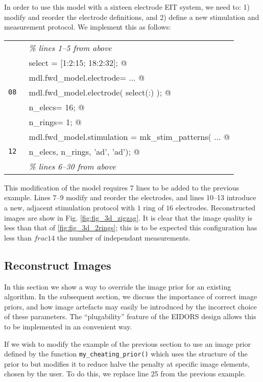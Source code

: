 \documentclass[12pt]{iopart}
\makeatletter
\newcommand{\CN}{\tt\small} %
\newcommand{\CC}{&\verb@}   % start code
\newcommand{\CI}{&\it}   % start code
\makeatother
\begin{document}
In order to use this model with a sixteen electrode EIT
system, we need to: 1) modify and reorder the electrode
definitions, and 2) define a new stimulation and measurement
protocol. We implement this as follows:

\begin{tabular}{ll}
\CN    \CI \% lines 1--5 from above \\
\CN    \CC select = [1:2:15; 18:2:32]; @\\
\CN    \CC mdl.fwd_model.electrode=  ... @\\
\CN 08 \CC     mdl.fwd_model.electrode( select(:) ); @\\
\CN    \CC n_elecs= 16; @\\
\CN    \CC n_rings= 1; @\\
\CN    \CC mdl.fwd_model.stimulation = mk_stim_patterns( ... @\\
\CN 12 \CC              n_elecs, n_rings, '{ad}', '{ad}'); @\\
\CN    \CI \% lines 6--30 from above \\
\end{tabular}

This modification of the model requires 7 lines to be added
to the previous example. Lines 7--9 modify and reorder the
electrodes, and lines 10--13 introduce a new, adjacent
stimulation protocol with $1$ ring of $16$ electrodes. Reconstructed
images are show in Fig. \ref{fig:fig_3d_zigzag}.
It is clear that the image quality is less than that of
\ref{fig:fig_3d_2rings}; this is to be expected this configuration
has less than $frac{1}{4}$ the number of independant measurements.
 

\subsection{  Reconstruct Images }

In this section we show a way to override the image prior
for an existing algorithm. In the subsequent section,
we discuss the importance of correct image priors,
and how image artefacts may easily be introduced by the incorrect
choice of these parameters. The ``plugability'' feature of the
EIDORS design allows this to be implemented in an convenient way.

If we wish to modify the example of the previous section
to use an image prior defined by the function
{\tt my\_cheating\_prior()} which uses the structure of the
prior to \cite{Polydorides_2002} but modifies it to reduce
halve the penalty at specific image elements, chosen by
the user. To do this, we replace line 25 from the previous
example.
\end{document}
